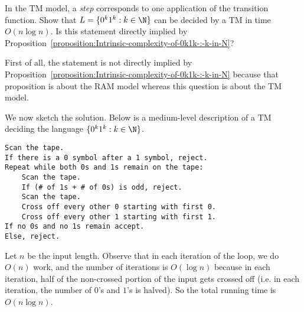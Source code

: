 \begin{flex}
\begin{exercise}[TM complexity of $\{0^k1^k : k \in \N\}$] \label{exercise:TM-complexity-of-0k1k-:-k-in-N}
In the TM model, a \emph{step} corresponds to one application of the transition function. Show that $L = \{0^k1^k : k \in \N\}$ can be decided by a TM in time $O(n \log n)$. Is this statement directly implied by Proposition~\ref{proposition:Intrinsic-complexity-of-0k1k-:-k-in-N}?
\end{exercise}

\begin{solution}
First of all, the statement is not directly implied by Proposition~\ref{proposition:Intrinsic-complexity-of-0k1k-:-k-in-N} because that proposition is about the RAM model whereas this question is about the TM model.

We now sketch the solution. Below is a medium-level description of a TM deciding the language $\{0^k1^k : k \in \N\}$.

\begin{verbatim}
Scan the tape.
If there is a 0 symbol after a 1 symbol, reject.
Repeat while both 0s and 1s remain on the tape:
    Scan the tape. 
    If (# of 1s + # of 0s) is odd, reject.
    Scan the tape. 
    Cross off every other 0 starting with first 0.
    Cross off every other 1 starting with first 1.
If no 0s and no 1s remain accept.
Else, reject. 
\end{verbatim}

Let $n$ be the input length. Observe that in each iteration of the loop, we do $O(n)$ work, and the number of iterations is $O(\log n)$ because in each iteration, half of the non-crossed portion of the input gets crossed off (i.e. in each iteration, the number of $0$'s and $1$'s is halved). So the total running time is $O(n \log n)$.
\end{solution}
\end{flex}


